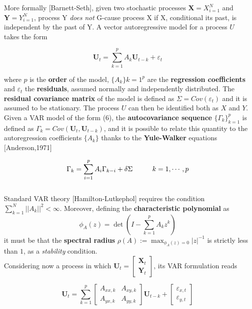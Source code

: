 \documentclass[a4paper]{article}
\begin{document}
More formally [Barnett-Seth], given two stochastic processes $ \textbf{X} = {X}_{i=1}^N $ and $ \textbf{Y} = {Y}_{i=1}^N $, process Y \textit{does not} G-cause process X if X, conditional its past, is independent by the past of Y. A vector autoregressive model for a process $U$ takes the form

\begin{equation}
\textbf{U}_t = \sum_{k=1}^{p} A_k \textbf{U}_{t-k} + \varepsilon_t 
\end{equation}



where $p$ is the \textbf{order} of the model, $\{ A_k\}{k=1}^p$ are the \textbf{regression coefficients} and $\varepsilon_t$ the \textbf{residuals}, assumed normally and independently distributed. The \textbf{ residual covariance matrix} of the model is defined as $ \Sigma = Cov(\varepsilon_t) $ and it is assumed to be stationary. The process $U$ can then be identified both as $X$ and $Y$. Given a VAR model of the form (6), the \textbf{autocovariance sequence} $ \{\Gamma_k\}_{k=1}^p $ is defined as $ \Gamma_k = Cov(\textbf{U}_t,\textbf{U}_{t-k})$, and it is possible to relate this quantity to the autoregression coefficients $\{ A_k\}$ thanks to the \textbf{Yule-Walker} equations [Anderson,1971]

\begin{equation}
\Gamma_k = \sum_{i=1}^{p} A_i \Gamma_{k-i} + \delta \Sigma \hspace{1 cm }  k = 1, \cdots, p
\end{equation}\\

Standard VAR theory [Hamilton-Lutkephol] requires the condition $ \sum_{k=1}^{N}||A_k||^2 < \infty $. Moreover, defining the \textbf{characteristic polynomial} as 
$$ \phi_A(z)= \det \left( I - \sum_{k=1}^{p} A_k z^k \right) $$
it must be that the \textbf{spectral radius} $\rho(A) := \max_{\phi_A(z)=0}|z|^{-1}$ is strictly less than $1$, as a \textit{stability} condition.
\\

Considering now a process in which $ \textbf{U}_t = \begin{bmatrix} \textbf{X}_t  \\  \textbf{Y}_t \end{bmatrix} $, its VAR formulation reads

\begin{equation}
\textbf{U}_t = \sum_{k=1}^{p} \begin{bmatrix} A_{xx,k}  &  A_{xy,k} \\  A_{yx,k}  & A_{yy,k} \end{bmatrix} \textbf{U}_{t-k} + \begin{bmatrix} \varepsilon_{x,t}  \\  \varepsilon_{y,t} \end{bmatrix}
\end{equation}
\end{document}
